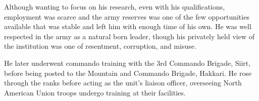 Although wanting to focus on his research, even with his qualifications, employment was scarce and the army reserves was one of the few opportunities available that was stable and left him with enough time of his own. He was well respected in the army as a natural born leader, though his privately held view of the institution was one of resentment, corruption, and misuse.

He later underwent commando training with the 3rd Commando Brigade, Siirt, before being posted to the Mountain and Commando Brigade, Hakkari. He rose through the ranks before acting as the unit's liaison officer, overseeing North American Union troops undergo training at their facilities.


